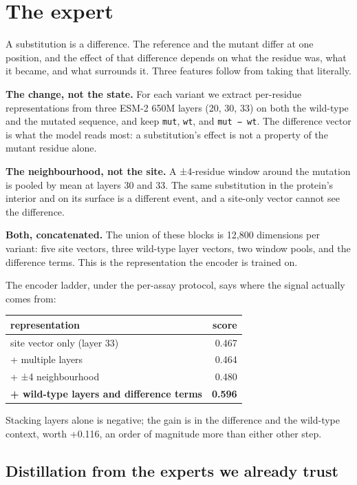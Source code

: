 \documentclass[sigconf,review,nonacm]{acmart}
\begin{document}
\section{The expert}\label{the-expert}

A substitution is a difference. The reference and the mutant differ at one position, and the effect of
that difference depends on what the residue was, what it became, and what surrounds it. Three features
follow from taking that literally.

\textbf{The change, not the state.} For each variant we extract per-residue representations from three ESM-2 650M layers \cite{esm2}
(20, 30, 33) on both the wild-type and the mutated sequence, and keep \texttt{mut}, \texttt{wt}, and
\texttt{mut\ −\ wt}. The difference vector is what the model reads most: a substitution's effect is not a
property of the mutant residue alone.

\textbf{The neighbourhood, not the site.} A ±4-residue window around the mutation is pooled by mean at layers
30 and 33. The same substitution in the protein's interior and on its surface is a different event, and
a site-only vector cannot see the difference.

\textbf{Both, concatenated.} The union of these blocks is 12,800 dimensions per variant: five site vectors,
three wild-type layer vectors, two window pools, and the difference terms. This is the representation the
encoder is trained on.

The encoder ladder, under the per-assay protocol, says where the signal actually comes from:

\begin{table}[t]
\centering
\small
\begin{tabular}{lr}
\hline
representation & score \\
\hline
site vector only (layer 33) & 0.467 \\
+ multiple layers & 0.464 \\
+ ±4 neighbourhood & 0.480 \\
\textbf{+ wild-type layers and difference terms} & \textbf{0.596} \\
\hline
\end{tabular}
\end{table}

Stacking layers alone is negative; the gain is in the difference and the wild-type context, worth
+0.116, an order of magnitude more than either other step.

\subsection{Distillation from the experts we already trust}\label{distillation-from-the-experts-we-already-trust}
\end{document}
